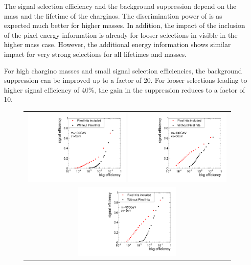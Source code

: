 The signal selection efficiency and the background suppression depend on the mass and the lifetime of the charginos.
The discrimination power of \ias is as expected much better for higher masses.
In addition, the impact of the inclusion of the pixel energy information is already for looser selections in \ias visible in the higher mass case.
However, the additional energy information shows similar impact for very strong selections for all lifetimes and masses.

For high chargino masses and small signal selection efficiencies, the background suppression can be improved up to a factor of 20.
For looser selections leading to higher signal efficiency of 40\%, the gain in the suppression reduces to a factor of 10.

\begin{figure}[!bt]
  \centering 
  \begin{tabular}{c}
    \includegraphics[width=0.49\textwidth]{figures/analysis/rocplot_wjets_mass_100GeV_ctau_5cm.pdf} 
    \includegraphics[width=0.49\textwidth]{figures/analysis/rocplot_wjets_mass_100GeV_ctau_50cm.pdf} \\
    \includegraphics[width=0.49\textwidth]{figures/analysis/rocplot_wjets_mass_500GeV_ctau_5cm.pdf} 

\end{tabular}
\end{figure}
